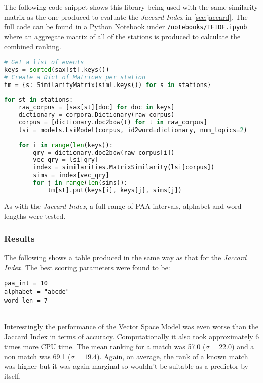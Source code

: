 \documentclass[../report.tex]{subfiles}
\begin{document}
	The following code snippet shows this library being used with the same similarity matrix as the one produced to evaluate the \textit{Jaccard Index} in \cref{sec:jaccard}.  The full code can be found in a Python Notebook under \verb|/notebooks/TFIDF.ipynb| where an aggregate matrix of all of the stations is produced to calculate the combined ranking.  
	
\begin{lstlisting}[language=Python]
# Get a list of events
keys = sorted(sax[st].keys())
# Create a Dict of Matrices per station
tm = {s: SimilarityMatrix(siml.keys()) for s in stations}
	
for st in stations:
	raw_corpus = [sax[st][doc] for doc in keys]
	dictionary = corpora.Dictionary(raw_corpus)
	corpus = [dictionary.doc2bow(t) for t in raw_corpus]
	lsi = models.LsiModel(corpus, id2word=dictionary, num_topics=2)
	
	for i in range(len(keys)):
		qry = dictionary.doc2bow(raw_corpus[i])
		vec_qry = lsi[qry]
		index = similarities.MatrixSimilarity(lsi[corpus])
		sims = index[vec_qry]
		for j in range(len(sims)):
			tm[st].put(keys[i], keys[j], sims[j])
\end{lstlisting}
	
	As with the \textit{Jaccard Index}, a full range of PAA intervals, alphabet and word lengths were tested.

	
\subsubsection{Results}

	The following shows a table produced in the same way as that for the \textit{Jaccard Index}.  The best scoring parameters were found to be:
\begin{verbatim}
paa_int = 10
alphabet = "abcde"
word_len = 7
\end{verbatim}
	
\\

	Interestingly the performance of the Vector Space Model was even worse than the Jaccard Index in terms of accuracy.  Computationally it also took approximately 6 times more CPU time.  The mean ranking for a match was 57.0 ($\sigma = 22.0$) and a non match was 69.1 ($\sigma = 19.4$).  Again, on average, the rank of a known match was higher but it was again marginal so wouldn't be suitable as a predictor by itself.
	
\end{document}
